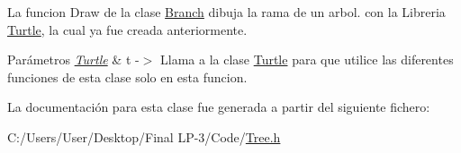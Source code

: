 La funcion Draw de la clase \mbox{\hyperlink{class_branch}{Branch}} dibuja la rama de un arbol. con la Libreria \mbox{\hyperlink{class_turtle}{Turtle}}, la cual ya fue creada anteriormente.
\begin{DoxyParams}{Parámetros}
{\em \mbox{\hyperlink{class_turtle}{Turtle}}} & t -\/$>$ Llama a la clase \mbox{\hyperlink{class_turtle}{Turtle}} para que utilice las diferentes funciones de esta clase solo en esta funcion. \\
\hline
\end{DoxyParams}


La documentación para esta clase fue generada a partir del siguiente fichero\+:\begin{DoxyCompactItemize}
\item 
C\+:/\+Users/\+User/\+Desktop/\+Final L\+P-\/3/\+Code/\mbox{\hyperlink{_tree_8h}{Tree.\+h}}\end{DoxyCompactItemize}
